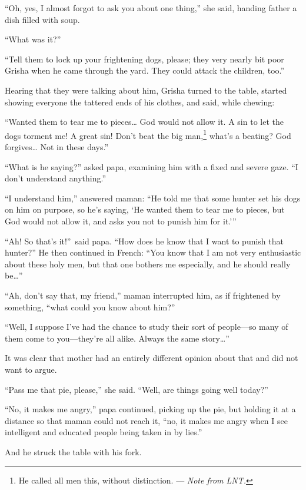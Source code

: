 ``Oh, yes, I almost forgot to ask you about one thing,'' she said, handing father a dish filled with soup. %

``What was it?'' %

``Tell them to lock up your frightening dogs, please; they very nearly bit poor Grisha when he came through the yard. They could attack the children, too.'' %

Hearing that they were talking about him, Grisha turned to the table, started showing everyone the tattered ends of his clothes, and said, while chewing:

``Wanted them to tear me to pieces\ldots{} God would not allow it. A sin to let the dogs torment me! A great sin! Don't beat the big man,\footnote{He called all men this, without distinction. --- \textit{Note from LNT.}} what's a beating? God forgives\ldots{} Not in these days.'' %

``What is he saying?'' asked papa, examining him with a fixed and severe gaze. ``I don't understand anything.'' %

``I understand him,'' answered maman: ``He told me that some hunter set his dogs on him on purpose, so he's saying, `He wanted them to tear me to pieces, but God would not allow it, and asks you not to punish him for it.''' %

``Ah! So that's it!''~said papa. ``How does he know that I want to punish that hunter?'' He then continued in French: ``You know that I am not very enthusiastic about these holy men, but that one bothers me especially, and he should really be\ldots{}'' %

``Ah, don't say that, my friend,'' maman interrupted him, as if frightened by something, ``what could you know about him?'' %

``Well, I suppose I've had the chance to study their sort of people---so many of them come to you---they're all alike. Always the same story\ldots{}'' %

It was clear that mother had an entirely different opinion about that and did not want to argue.

``Pass me that pie, please,'' she said. ``Well, are things going well today?'' %

``No, it makes me angry,'' papa continued, picking up the pie, but holding it at a distance so that maman could not reach it, ``no, it makes me angry when I see intelligent and educated people being taken in by lies.'' %

And he struck the table with his fork.

